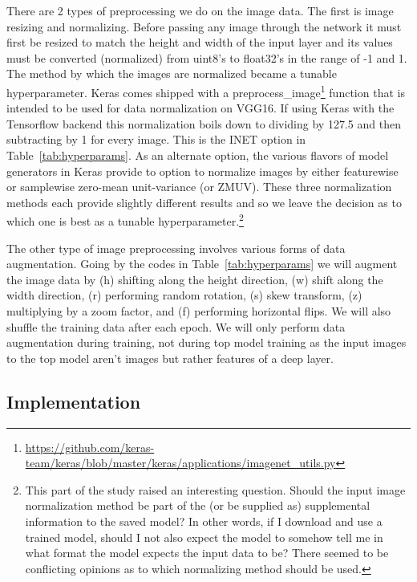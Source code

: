 \documentclass[12pt,journal,compsoc]{IEEEtran}
\begin{document}
There are 2 types of preprocessing we do on the image data. The first is image resizing and normalizing. Before passing any image through the network it must first be resized to match the height and width of the input layer and its values must be converted (normalized) from uint8's to float32's in the range of -1 and 1.  The method by which the images are normalized became a tunable hyperparameter.  Keras comes shipped with a preprocess\_image\footnote{\url{https://github.com/keras-team/keras/blob/master/keras/applications/imagenet_utils.py}} function that is intended to be used for data normalization on VGG16.  If using Keras with the Tensorflow backend this normalization boils down to dividing by 127.5 and then subtracting by 1 for every image.  This is the INET option in Table~\ref{tab:hyperparams}. As an alternate option, the various flavors of model generators in Keras provide to option to normalize images by either featurewise or samplewise zero-mean unit-variance (or ZMUV).  These three normalization methods each provide slightly different results and so we leave the decision as to which one is best as a tunable hyperparameter.\footnote{This part of the study raised an interesting question. Should the input image normalization method be part of the (or be supplied as) supplemental information to the saved model?  In other words, if I download and use a trained model, should I not also expect the model to somehow tell me in what format the model expects the input data to be? There seemed to be conflicting opinions as to which normalizing method should be used.}

The other type of image preprocessing involves various forms of data augmentation.  Going by the codes in Table~\ref{tab:hyperparams} we will augment the image data by (h) shifting along the height direction, (w) shift along the width direction, (r) performing random rotation, (s) skew transform, (z) multiplying by a zoom factor, and (f) performing horizontal flips.  We will also shuffle the training data after each epoch. We will only perform data augmentation during training, not during top model training as the input images to the top model aren't images but rather features of a deep layer.


\subsection{Implementation}
\end{document}
